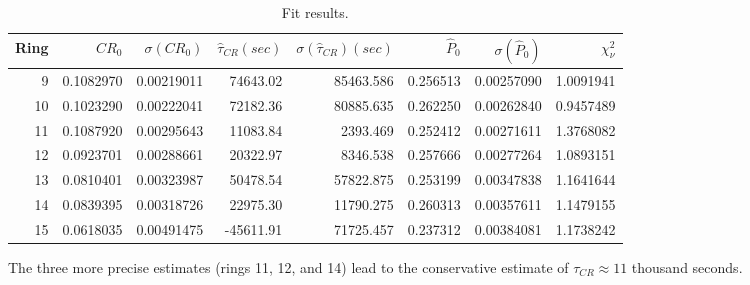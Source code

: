 \documentclass{article}
\begin{document}
\begin{table}[h]
	\centering
	\caption{Fit results.\label{tbl:FitRes}}
	\begin{tabular}{rrrrrrrr}
		\hline
		Ring &    $CR_0$ & $\sigma(CR_0)$ & $\hat{\tau}_{CR} (sec)$ & $\sigma(\hat{\tau}_{CR})(sec)$ & $\hat{P}_0$ & $\sigma(\hat{P}_0)$ & $\chi^2_\nu$\\ \hline
		   9 & 0.1082970 &     0.00219011 &                74643.02 &                      85463.586 &    0.256513 &          0.00257090 & 1.0091941\\
		  10 & 0.1023290 &     0.00222041 &                72182.36 &                      80885.635 &    0.262250 &          0.00262840 & 0.9457489\\
		  11 & 0.1087920 &     0.00295643 &                11083.84 &                       2393.469 &    0.252412 &          0.00271611 & 1.3768082\\
		  12 & 0.0923701 &     0.00288661 &                20322.97 &                       8346.538 &    0.257666 &          0.00277264 & 1.0893151\\
		  13 & 0.0810401 &     0.00323987 &                50478.54 &                      57822.875 &    0.253199 &          0.00347838 & 1.1641644\\
		  14 & 0.0839395 &     0.00318726 &                22975.30 &                      11790.275 &    0.260313 &          0.00357611 & 1.1479155\\
		  15 & 0.0618035 &     0.00491475 &               -45611.91 &                      71725.457 &    0.237312 &          0.00384081 & 1.1738242\\ \hline
	\end{tabular}
\end{table}

The three more precise estimates (rings 11, 12, and 14) lead to the conservative estimate of $\tau_{CR}\approx 11$ thousand seconds.
\end{document}
